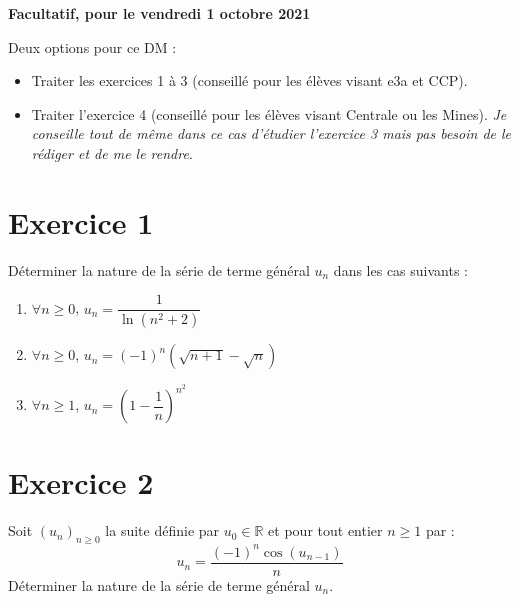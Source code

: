 \documentclass[a4paper,french,11pt,twoside]{VcCours}
\begin{document}
\begin{center}
\large\bf 
Facultatif, pour le vendredi 1 octobre 2021
\end{center}
\separationTitre


Deux options pour ce DM :

\begin{itemize}
\item Traiter les exercices 1 à 3 (conseillé pour les élèves visant e3a et CCP).
\item Traiter l'exercice 4 (conseillé pour les élèves visant Centrale ou les Mines). \emph{Je conseille tout de même dans ce cas d'étudier l'exercice 3 mais pas besoin de le rédiger et de me le rendre}.
\end{itemize}

\medskip

\section*{Exercice 1}
Déterminer la nature de la série de terme général $u_n$ dans les cas suivants :

\begin{enumerate}
\item $\forall n \geq 0$, $u_n = \dfrac{1}{\ln(n^2+2)}$
\item $\forall n \geq 0$, $u_n = (-1)^n (\sqrt{n+1} - \sqrt{n})$
\item $\forall n \geq 1$, $u_n = \left( 1 - \dfrac{1}{n} \right)^{n^2}$
\end{enumerate}

\medskip

\section*{Exercice 2}
Soit $(u_n)_{n \geq 0}$ la suite définie par $u_0 \in \mathbb{R}$ et pour tout entier $n \geq 1$ par :
$$ u_{n} = \dfrac{(-1)^n \cos(u_{n-1})}{n}$$
Déterminer la nature de la série de terme général $u_n$.
\end{document}
